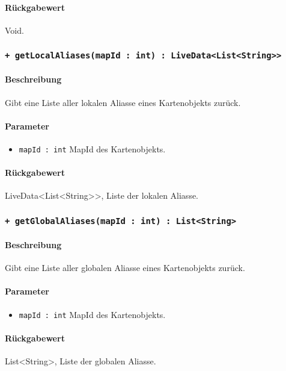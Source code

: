 \paragraph*{Rückgabewert}
Void.

\subsubsection*{\texttt{+ getLocalAliases(mapId : int) : LiveData<List<String>>}}%
\paragraph*{Beschreibung}
Gibt eine Liste aller lokalen Aliasse eines Kartenobjekts zurück.
\paragraph*{Parameter}
\begin{itemize}
    \item \texttt{mapId : int} MapId des Kartenobjekts.
\end{itemize}
\paragraph*{Rückgabewert}
LiveData<List<String>>, Liste der lokalen Aliasse.

\subsubsection*{\texttt{+ getGlobalAliases(mapId : int) : List<String>}}%
\paragraph*{Beschreibung}
Gibt eine Liste aller globalen Aliasse eines Kartenobjekts zurück. 
\paragraph*{Parameter}
\begin{itemize}
    \item \texttt{mapId : int} MapId des Kartenobjekts.
\end{itemize}
\paragraph*{Rückgabewert}
List<String>, Liste der globalen Aliasse.